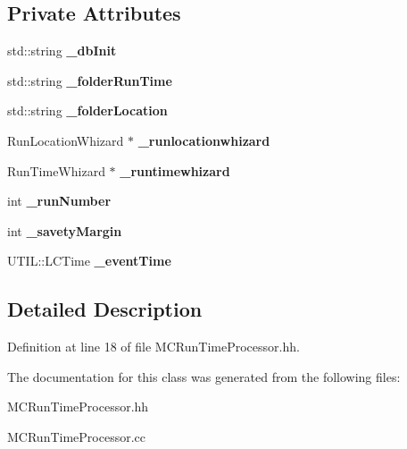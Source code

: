\subsection*{Private Attributes}
\begin{DoxyCompactItemize}
\item 
std::string {\bfseries \_\-dbInit}\label{classmarlin_1_1MCRunTimeProcessor_a4e743478c041ee93d3256134520e3c49}

\item 
std::string {\bfseries \_\-folderRunTime}\label{classmarlin_1_1MCRunTimeProcessor_a30df635002d96b32291813aa3f91d585}

\item 
std::string {\bfseries \_\-folderLocation}\label{classmarlin_1_1MCRunTimeProcessor_a2be1163f77699025a223cd1ebb1040f4}

\item 
RunLocationWhizard $\ast$ {\bfseries \_\-runlocationwhizard}\label{classmarlin_1_1MCRunTimeProcessor_a29bd192e54ae09e3b3dd9240b2f7ac23}

\item 
RunTimeWhizard $\ast$ {\bfseries \_\-runtimewhizard}\label{classmarlin_1_1MCRunTimeProcessor_a136eebf08c52e00b691e7ad562ebae76}

\item 
int {\bfseries \_\-runNumber}\label{classmarlin_1_1MCRunTimeProcessor_a9e3dea800b1c0e2104a00a5007714ddd}

\item 
int {\bfseries \_\-savetyMargin}\label{classmarlin_1_1MCRunTimeProcessor_ae97bf35ad864f1bafba1864de9d03bc5}

\item 
UTIL::LCTime {\bfseries \_\-eventTime}\label{classmarlin_1_1MCRunTimeProcessor_a119971e6c2b38d2ff99240191f82ce09}

\end{DoxyCompactItemize}


\subsection{Detailed Description}


Definition at line 18 of file MCRunTimeProcessor.hh.

The documentation for this class was generated from the following files:\begin{DoxyCompactItemize}
\item 
MCRunTimeProcessor.hh\item 
MCRunTimeProcessor.cc\end{DoxyCompactItemize}
